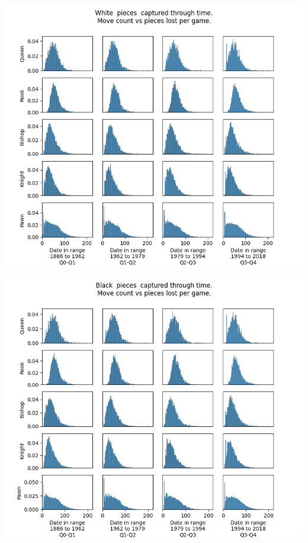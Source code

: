 \documentclass[11pt]{article}
\begin{document}
\begin{center}
\includegraphics[width=\textwidth]{Images/_HIST_Queen_Rook_Bishop_Knight_Pawn_WHITE_DATE.png}
\end{center}

\begin{center}
\includegraphics[width=\textwidth]{Images/_HIST_Queen_Rook_Bishop_Knight_Pawn_BLACK_DATE.png}
\end{center}
\end{document}
